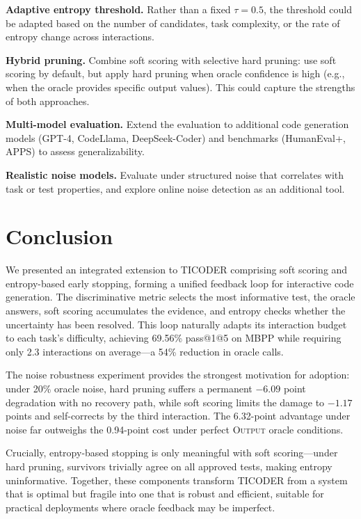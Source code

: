 \documentclass[conference]{IEEEtran}
\begin{document}
\textbf{Adaptive entropy threshold.} Rather than a fixed $\tau = 0.5$, the threshold could be adapted based on the number of candidates, task complexity, or the rate of entropy change across interactions.

\textbf{Hybrid pruning.} Combine soft scoring with selective hard pruning: use soft scoring by default, but apply hard pruning when oracle confidence is high (e.g., when the oracle provides specific output values). This could capture the strengths of both approaches.

\textbf{Multi-model evaluation.} Extend the evaluation to additional code generation models (GPT-4, CodeLlama, DeepSeek-Coder) and benchmarks (HumanEval+, APPS) to assess generalizability.

\textbf{Realistic noise models.} Evaluate under structured noise that correlates with task or test properties, and explore online noise detection as an additional tool.

\section{Conclusion}

We presented an integrated extension to TICODER comprising soft scoring and entropy-based early stopping, forming a unified feedback loop for interactive code generation. The discriminative metric selects the most informative test, the oracle answers, soft scoring accumulates the evidence, and entropy checks whether the uncertainty has been resolved. This loop naturally adapts its interaction budget to each task's difficulty, achieving 69.56\% pass@1@5 on MBPP while requiring only 2.3 interactions on average---a 54\% reduction in oracle calls.

The noise robustness experiment provides the strongest motivation for adoption: under 20\% oracle noise, hard pruning suffers a permanent $-6.09$ point degradation with no recovery path, while soft scoring limits the damage to $-1.17$ points and self-corrects by the third interaction. The 6.32-point advantage under noise far outweighs the 0.94-point cost under perfect \textsc{Output} oracle conditions.

Crucially, entropy-based stopping is only meaningful with soft scoring---under hard pruning, survivors trivially agree on all approved tests, making entropy uninformative. Together, these components transform TICODER from a system that is optimal but fragile into one that is robust and efficient, suitable for practical deployments where oracle feedback may be imperfect.
\end{document}

